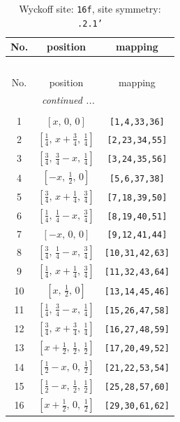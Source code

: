 \documentclass[fleqn,8pt]{jsarticle}
\begin{document}
\begin{longtable}{ccc}
\caption{Wyckoff site: {\tt 16f}, site symmetry: {\tt .2.1'}}
 \\
 \hline \hline
No. & position & mapping \\ \hline \endfirsthead

\multicolumn{2}{l}{\tablename\ \thetable{}} \\
 \hline \hline
No. & position & mapping \\ \hline \endhead

 \hline \hline
\multicolumn{2}{r}{\footnotesize\it continued ...} \\ \endfoot

 \hline \hline
\multicolumn{2}{r}{} \\ \endlastfoot

1 & $\left[ x,\, 0,\, 0 \right]$ & {\tt [1,4,33,36]} \\ \hline
2 & $\left[ \frac{1}{4},\, x + \frac{3}{4},\, \frac{1}{4} \right]$ & {\tt [2,23,34,55]} \\ \hline
3 & $\left[ \frac{3}{4},\, \frac{3}{4} - x,\, \frac{1}{4} \right]$ & {\tt [3,24,35,56]} \\ \hline
4 & $\left[ - x,\, \frac{1}{2},\, 0 \right]$ & {\tt [5,6,37,38]} \\ \hline
5 & $\left[ \frac{3}{4},\, x + \frac{1}{4},\, \frac{3}{4} \right]$ & {\tt [7,18,39,50]} \\ \hline
6 & $\left[ \frac{1}{4},\, \frac{1}{4} - x,\, \frac{3}{4} \right]$ & {\tt [8,19,40,51]} \\ \hline
7 & $\left[ - x,\, 0,\, 0 \right]$ & {\tt [9,12,41,44]} \\ \hline
8 & $\left[ \frac{3}{4},\, \frac{1}{4} - x,\, \frac{3}{4} \right]$ & {\tt [10,31,42,63]} \\ \hline
9 & $\left[ \frac{1}{4},\, x + \frac{1}{4},\, \frac{3}{4} \right]$ & {\tt [11,32,43,64]} \\ \hline
10 & $\left[ x,\, \frac{1}{2},\, 0 \right]$ & {\tt [13,14,45,46]} \\ \hline
11 & $\left[ \frac{1}{4},\, \frac{3}{4} - x,\, \frac{1}{4} \right]$ & {\tt [15,26,47,58]} \\ \hline
12 & $\left[ \frac{3}{4},\, x + \frac{3}{4},\, \frac{1}{4} \right]$ & {\tt [16,27,48,59]} \\ \hline
13 & $\left[ x + \frac{1}{2},\, \frac{1}{2},\, \frac{1}{2} \right]$ & {\tt [17,20,49,52]} \\ \hline
14 & $\left[ \frac{1}{2} - x,\, 0,\, \frac{1}{2} \right]$ & {\tt [21,22,53,54]} \\ \hline
15 & $\left[ \frac{1}{2} - x,\, \frac{1}{2},\, \frac{1}{2} \right]$ & {\tt [25,28,57,60]} \\ \hline
16 & $\left[ x + \frac{1}{2},\, 0,\, \frac{1}{2} \right]$ & {\tt [29,30,61,62]} \\
\end{longtable}
\end{document}
